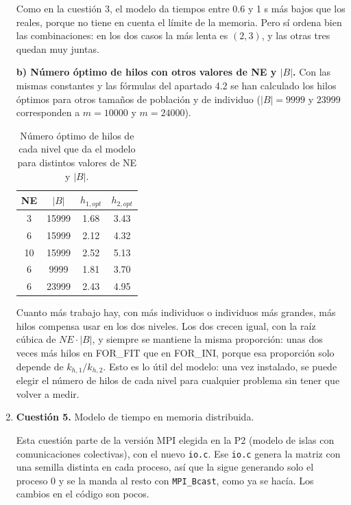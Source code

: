 \documentclass[12pt]{article}
\begin{document}
\begin{enumerate}
Como en la cuestión 3, el modelo da tiempos entre 0.6 y 1 s más bajos que los reales, porque no tiene en cuenta el límite de la memoria. Pero sí ordena bien las combinaciones: en los dos casos la más lenta es $(2, 3)$, y las otras tres quedan muy juntas.

\textbf{b) Número óptimo de hilos con otros valores de NE y $|B|$.} Con las mismas constantes y las fórmulas del apartado 4.2 se han calculado los hilos óptimos para otros tamaños de población y de individuo ($|B| = 9999$ y $23999$ corresponden a $m = 10000$ y $m = 24000$).

\begin{table}[htbp]
\centering
\begin{tabular}{cc|cc}
\toprule
\textbf{NE} & \textbf{$|B|$} & \textbf{$h_{1,opt}$} & \textbf{$h_{2,opt}$} \\
\midrule
3 & 15999 & 1.68 & 3.43 \\
6 & 15999 & 2.12 & 4.32 \\
10 & 15999 & 2.52 & 5.13 \\
6 & 9999 & 1.81 & 3.70 \\
6 & 23999 & 2.43 & 4.95 \\
\bottomrule
\end{tabular}
\caption{Número óptimo de hilos de cada nivel que da el modelo para distintos valores de NE y $|B|$.}
\label{tab:c4_otros}
\end{table}

Cuanto más trabajo hay, con más individuos o individuos más grandes, más hilos compensa usar en los dos niveles. Los dos crecen igual, con la raíz cúbica de $NE \cdot |B|$, y siempre se mantiene la misma proporción: unas dos veces más hilos en FOR\_FIT que en FOR\_INI, porque esa proporción solo depende de $k_{h,1}/k_{h,2}$. Esto es lo útil del modelo: una vez instalado, se puede elegir el número de hilos de cada nivel para cualquier problema sin tener que volver a medir.

\newpage
\item \textbf{Cuestión 5.} Modelo de tiempo en memoria distribuida.


Esta cuestión parte de la versión MPI elegida en la P2 (modelo de islas con comunicaciones colectivas), con el nuevo \texttt{io.c}. Ese \texttt{io.c} genera la matriz con una semilla distinta en cada proceso, así que la sigue generando solo el proceso 0 y se la manda al resto con \texttt{MPI\_Bcast}, como ya se hacía. Los cambios en el código son pocos.


\end{enumerate}
\end{document}
